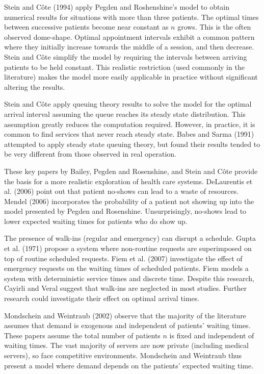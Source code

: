 \documentclass{article}
\begin{document}
Stein and C\^{o}te (1994) \cite{Stein} apply Pegden and Roshenshine's model to obtain numerical results for situations with more than three patients. The optimal times between successive patients become near constant as $n$ grows. This is the often observed dome-shape. Optimal appointment intervals exhibit a common pattern where they initially increase towards the middle of a session, and then decrease. Stein and C\^{o}te simplify the model by requiring the intervals between arriving patients to be held constant. This realistic restriction (used commonly in the literature) makes the model more easily applicable in practice without significant altering the results.

Stein and C\^{o}te apply queuing theory results to solve the model for the optimal arrival interval assuming the queue reaches its steady state distribution. This assumption greatly reduces the computation required. However, in practice, it is common to find services that never reach steady state. Babes and Sarma (1991) \cite{Babes} attempted to apply steady state queuing theory, but found their results tended to be very different from those observed in real operation.

These key papers by Bailey, Pegden and Rosenshine, and Stein and C\^{o}te provide the basis for a more realistic exploration of health care systems. DeLaurentis et al. (2006) \cite{Delaurentis} point out that patient no-shows can lead to a waste of resources. Mendel (2006) \cite{Mendel} incorporates the probability of a patient not showing up into the model presented by Pegden and Rosenshine. Unsurprisingly, no-shows lead to lower expected waiting times for patients who do show up.

The presence of walk-ins (regular and emergency) can disrupt a schedule. Gupta et al. (1971) \cite{Gupta} propose a system where non-routine requests are superimposed on top of routine scheduled requests. Fiem et al. (2007) \cite{Fiems} investigate the effect of emergency requests on the waiting times of scheduled patients. Fiem models a system with deterministic service times and discrete time. Despite this research, Cayirli and Veral suggest that walk-ins are neglected in most studies. Further research could investigate their effect on optimal arrival times.

Mondschein and Weintraub (2002) \cite{Mondschein} observe that the majority of the literature assumes that demand is exogenous and independent of patients' waiting times. These papers assume the total number of patients $n$ is fixed and independent of waiting times. The vast majority of servers are now private (including medical servers), so face competitive environments. Mondschein and Weintraub thus present a model where demand depends on the patients' expected waiting time.
\end{document}
